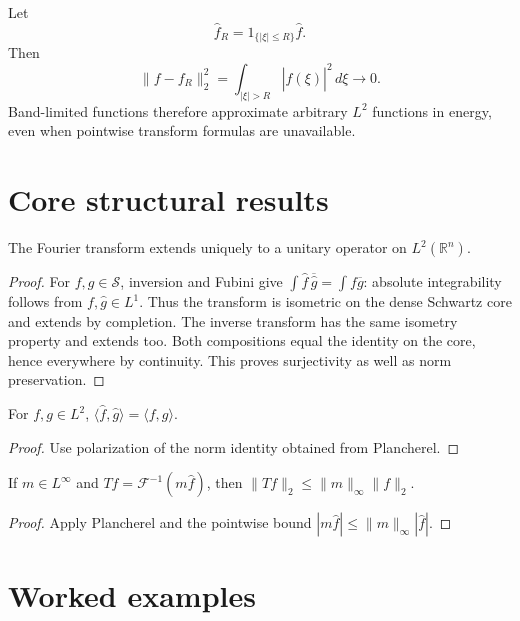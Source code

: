 \begin{example}\label{ex:iii13-expand-03}
Let
\[
\widehat f_R=1_{\{|\xi|\le R\}}\widehat f.
\]
Then
\[
\|f-f_R\|_2^2
=\int_{|\xi|>R}|\widehat f(\xi)|^2\,d\xi\to0.
\]
Band-limited functions therefore approximate arbitrary \(L^2\) functions in
energy, even when pointwise transform formulas are unavailable.
\end{example}
\section{Core structural results}

\begin{theorem}\label{thm:iii13-01}
The Fourier transform extends uniquely to a unitary operator on $L^2(\mathbb R^n)$.
\begin{proof}
For $f,g\in\mathcal S$, inversion and Fubini give $\int\widehat f\,\overline{\widehat g}=\int f\overline g$: absolute integrability follows from $f,\widehat g\in L^1$. Thus the transform is isometric on the dense Schwartz core and extends by completion. The inverse transform has the same isometry property and extends too. Both compositions equal the identity on the core, hence everywhere by continuity. This proves surjectivity as well as norm preservation.
\end{proof}
\end{theorem}

\begin{theorem}\label{thm:iii13-02}
For $f,g\in L^2$, $\langle\widehat f,\widehat g\rangle=\langle f,g\rangle$.
\begin{proof}
Use polarization of the norm identity obtained from Plancherel.
\end{proof}
\end{theorem}

\begin{theorem}\label{thm:iii13-03}
If $m\in L^\infty$ and $Tf=\mathcal F^{-1}(m\widehat f)$, then $\|Tf\|_2\le\|m\|_\infty\|f\|_2$.
\begin{proof}
Apply Plancherel and the pointwise bound $|m\widehat f|\le\|m\|_\infty|\widehat f|$.
\end{proof}
\end{theorem}

\section{Worked examples}

